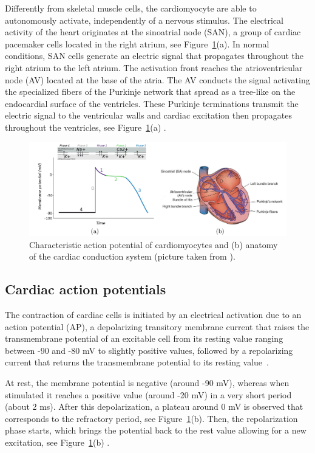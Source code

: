 \documentclass[11pt,a4paper]{article}
\begin{document}
Differently from skeletal muscle cells, the cardiomyocyte are able to autonomously activate, independently of a nervous stimulus. The electrical activity of the heart originates at the sinoatrial node (SAN), a group of cardiac pacemaker cells located in the right atrium, see Figure~\ref{fig:heart}(a). In normal conditions, SAN cells generate an electric signal that propagates throughout the right atrium to the left atrium. The activation front reaches the atrioventricular node (AV) located at the base of the atria. The AV conducts the signal activating the specialized fibers of the Purkinje network that spread as a tree-like on the endocardial surface of the ventricles. These Purkinje terminations transmit the electric signal to the ventricular walls and cardiac excitation then propagates throughout the ventricles, see Figure~\ref{fig:heart}(a) \cite{franzone2014mathematical}. 
\begin{figure}
	\centering
	\includegraphics[width=1\textwidth]{./Images/heart_activation.png}
	\caption{Characteristic action potential of cardiomyocytes and (b) anatomy of the cardiac conduction system (picture taken from \cite{quarteroni2019}).}
	\label{fig:heart}
\end{figure}

\subsection{Cardiac action potentials}\label{subsec:ap}

The contraction of cardiac cells is initiated by an electrical activation due to an action potential (AP), a depolarizing transitory membrane current
that raises the transmembrane potential of an excitable cell from its resting value ranging between -90 and -80 mV to slightly positive values, followed by a repolarizing current that returns the transmembrane potential to its resting value~\cite{franzone2014mathematical}. 

At rest, the membrane potential is negative (around -90 mV), whereas when stimulated it reaches a positive value (around -20 mV) in a very short period (about 2 ms). After this depolarization, a plateau around 0 mV is observed that corresponds to the refractory period, see Figure~\ref{fig:heart}(b).
Then, the repolarization phase starts, which brings the potential back to
the rest value allowing for a new excitation, see Figure~\ref{fig:heart}(b) \cite{quarteroni2019}. 
\end{document}
